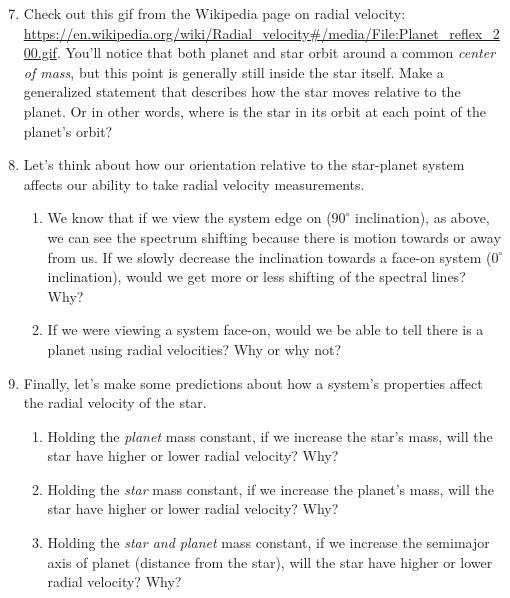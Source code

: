 \documentclass[11pt]{article}
\begin{document}
\begin{enumerate}
\setcounter{enumi}{6}
    \item Check out this gif from the Wikipedia page on radial velocity: \url{https://en.wikipedia.org/wiki/Radial_velocity#/media/File:Planet_reflex_200.gif}.  You'll notice that both planet and star orbit around a common \textit{center of mass}, but this point is generally still inside the star itself.  Make a generalized statement that describes how the star moves relative to the planet. Or in other words, where is the star in its orbit at each point of the planet's orbit?
        
    \item Let's think about how our orientation relative to the star-planet system affects our ability to take radial velocity measurements.
        \begin{enumerate}
            \item We know that if we view the system edge on ($90^\circ$ inclination), as above, we can see the spectrum shifting because there is motion towards or away from us.  If we slowly decrease the inclination towards a face-on system ($0^\circ$ inclination), would we get more or less shifting of the spectral lines? Why?
            
            \item If we were viewing a system face-on, would we be able to tell there is a planet using radial velocities? Why or why not?
        \end{enumerate}
        
    \item Finally, let's make some predictions about how a system's properties affect the radial velocity of the star.
    \begin{enumerate}
        \item Holding the \textit{planet} mass constant, if we increase the star's mass, will the star have higher or lower radial velocity? Why?
        \item Holding the \textit{star} mass constant, if we increase the planet's mass, will the star have higher or lower radial velocity? Why?
        \item Holding the \textit{star and planet} mass constant, if we increase the semimajor axis of planet (distance from the star), will the star have higher or lower radial velocity? Why?
    \end{enumerate}
        
\end{enumerate}
\end{document}
